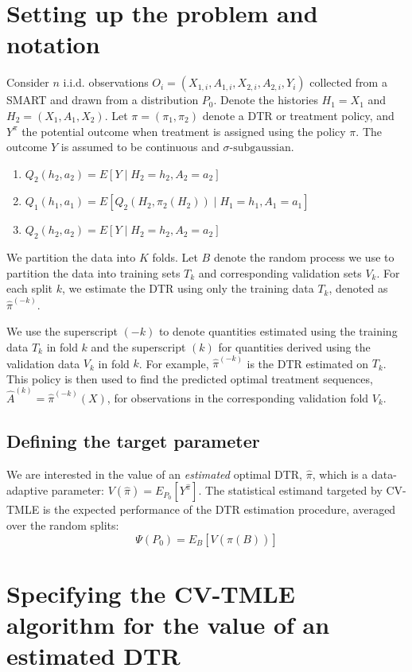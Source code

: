 \documentclass{article}
\author{John Sperger}
\begin{document}
\section{Setting up the problem and notation}
Consider $n$ i.i.d. observations $O_i=(X_{1,i}, A_{1,i}, X_{2,i}, A_{2,i}, Y_i)$ collected from a SMART and drawn from a distribution $P_0$. Denote the histories $H_1=X_1$ and $H_2=(X_1, A_1, X_2)$. Let \(\pi=(\pi_1, \pi_2)\) denote a DTR or treatment policy, and $Y^{\pi}$ the potential outcome when treatment is assigned using the policy $\pi$. The outcome $Y$ is assumed to be continuous and $\sigma\text{-subgaussian}$.

\begin{enumerate}
	\item \(Q_2(h_2, a_2) = E[Y \mid H_2=h_2, A_2=a_2]\)
	\item \(Q_1(h_1, a_1) = E[Q_2(H_2, \pi_2(H_2)) \mid H_1=h_1, A_1=a_1]\)
	\item \(Q_2(h_2, a_2) = E[Y \mid H_2=h_2, A_2=a_2]\)
\end{enumerate}

We partition the data into \(K\) folds. Let \(B\) denote the random process we use to partition the data into training sets \(T_k\) and corresponding validation sets \(V_k\). For each split \(k\), we estimate the DTR using only the training data \(T_k\), denoted as \(\hat{\pi}^{(-k)}\).

We use the superscript \((-k)\) to denote quantities estimated using the training data \(T_k\) in fold $k$ and the superscript \((k)\) for quantities derived using the validation data $V_k$ in fold $k$. For example, \(\widehat{\pi}^{(-k)}\) is the DTR estimated on \(T_k\). This policy is then used to find the predicted optimal treatment sequences, \(\widehat{A}^{(k)} = \widehat{\pi}^{(-k)}(X)\), for observations in the corresponding validation fold \(V_k\).


\subsection{Defining the target parameter}
We are interested in the value of an \textit{estimated} optimal DTR, $\widehat{\pi}$, which is a data-adaptive parameter: $V(\widehat{\pi})=E_{P_0}[Y^{\widehat{\pi}}]$. The statistical estimand targeted by CV-TMLE is the expected performance of the DTR estimation procedure, averaged over the random splits:
\[
	\Psi(P_0) = E_B[V(\hat{\pi}(B))]
\]

\section{Specifying the CV-TMLE algorithm for the value of an estimated DTR}
\end{document}

